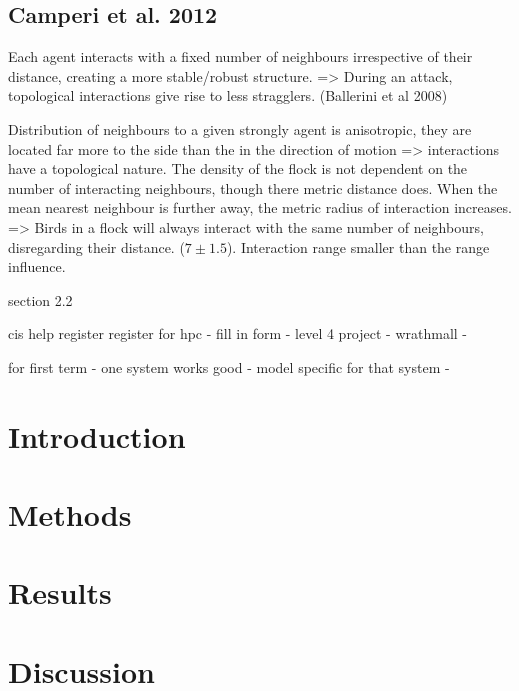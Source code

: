 \documentclass[10pt,twocolumn]{revtex4-2}    %
\begin{document}
\subsection{Camperi et al. 2012}

Each agent interacts with a fixed number of neighbours irrespective of their distance, creating a more stable/robust structure. => During an attack, topological interactions give rise to less stragglers. (Ballerini et al 2008)

Distribution of neighbours to a given strongly agent is anisotropic, they are located far more to the side than the in the direction of motion => interactions have a topological nature. The density of the flock is not dependent on the number of interacting neighbours, though there metric distance does. When the mean nearest neighbour is further away, the metric radius of interaction increases. => Birds in a flock will always interact with the same number of neighbours, disregarding their distance. ($7\pm1.5$). Interaction range smaller than the range influence.

section 2.2 








cis help register
register for hpc - fill in form - level 4 project - wrathmall - 

for first term - one system works good - model specific for that system - 





\section{Introduction} 

 

\section{Methods} 


 
\section{Results} 


\section{Discussion} 
\end{document}
